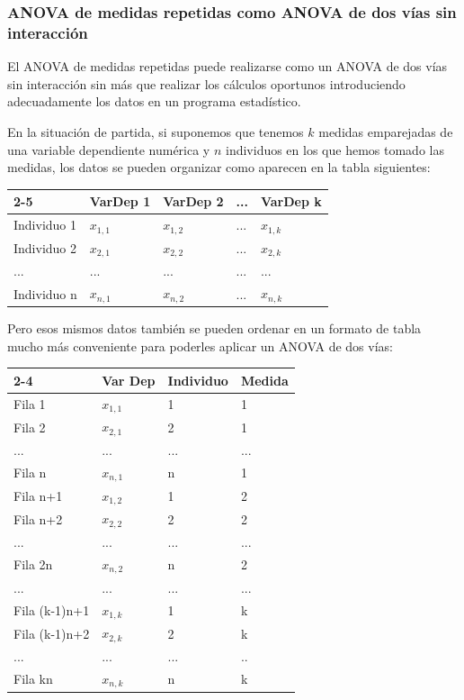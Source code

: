 \documentclass[
  spanish,
  a4paper,
]{scrreport}
\newcounter{none} %
\theoremstyle{plain}
\theoremstyle{definition}
\theoremstyle{definition}
\theoremstyle{remark}
\begin{document}
\subsubsection{ANOVA de medidas repetidas como ANOVA de dos vías sin
interacción}\label{anova-de-medidas-repetidas-como-anova-de-dos-vuxedas-sin-interacciuxf3n}

El ANOVA de medidas repetidas puede realizarse como un ANOVA de dos vías
sin interacción sin más que realizar los cálculos oportunos
introduciendo adecuadamente los datos en un programa estadístico.

En la situación de partida, si suponemos que tenemos \(k\) medidas
emparejadas de una variable dependiente numérica y \(n\) individuos en
los que hemos tomado las medidas, los datos se pueden organizar como
aparecen en la tabla siguientes:

{\def\LTcaptype{none} %
\begin{longtable}[]{@{}lllll@{}}
\toprule\noalign{}
2-5 & VarDep 1 & VarDep 2 & ... & VarDep k \\
\midrule\noalign{}
\endhead
\bottomrule\noalign{}
\endlastfoot
Individuo 1 & \(x_{1,1}\) & \(x_{1,2}\) & ... & \(x_{1,k}\) \\
Individuo 2 & \(x_{2,1}\) & \(x_{2,2}\) & ... & \(x_{2,k}\) \\
... & ... & ... & ... & ... \\
Individuo n & \(x_{n,1}\) & \(x_{n,2}\) & ... & \(x_{n,k}\) \\
\end{longtable}
}

Pero esos mismos datos también se pueden ordenar en un formato de tabla
mucho más conveniente para poderles aplicar un ANOVA de dos vías:

{\def\LTcaptype{none} %
\begin{longtable}[]{@{}llll@{}}
\toprule\noalign{}
2-4 & Var Dep & Individuo & Medida \\
\midrule\noalign{}
\endhead
\bottomrule\noalign{}
\endlastfoot
Fila 1 & \(x_{1,1}\) & 1 & 1 \\
Fila 2 & \(x_{2,1}\) & 2 & 1 \\
... & ... & ... & ... \\
Fila n & \(x_{n,1}\) & n & 1 \\
Fila n+1 & \(x_{1,2}\) & 1 & 2 \\
Fila n+2 & \(x_{2,2}\) & 2 & 2 \\
... & ... & ... & ... \\
Fila 2n & \(x_{n,2}\) & n & 2 \\
... & ... & ... & ... \\
Fila (k-1)n+1 & \(x_{1,k}\) & 1 & k \\
Fila (k-1)n+2 & \(x_{2,k}\) & 2 & k \\
... & ... & ... & .. \\
Fila kn & \(x_{n,k}\) & n & k \\
\end{longtable}
}
\end{document}
